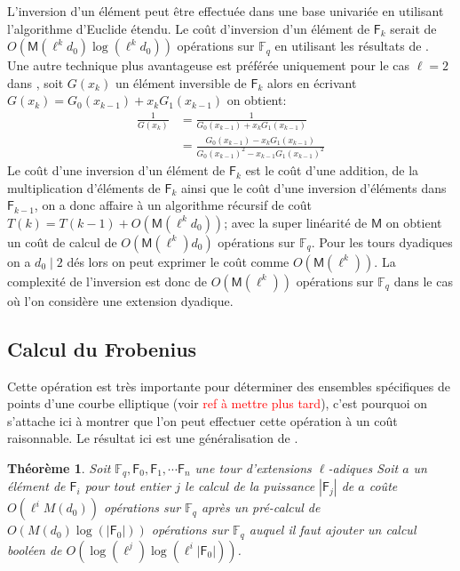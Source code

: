 \documentclass[10pt,a4paper]{book}
\theoremstyle{plain}
\newtheorem{thm}{Théorème}
\theoremstyle{definition}
\theoremstyle{definition}
\theoremstyle{definition}
\theoremstyle{definition}
\theoremstyle{remark}
\theoremstyle{remark}
\begin{document}
L'inversion d'un élément peut être effectuée dans une base univariée en utilisant l'algorithme d'Euclide étendu. Le coût d'inversion d'un élément de $\mathsf{F}_k$ serait de $O(\mathsf{M}(\ell^kd_0)\log(\ell^kd_0))$ opérations sur $\mathbb{F}_q$ en utilisant les résultats de \cite[ch.11]{vzGJG03}. Une autre technique plus avantageuse est préférée uniquement pour le cas $\ell=2$ dans \cite{Doliskani-Schost15}, soit $G(x_k)$ un élément inversible de $\mathsf{F}_k$ alors en écrivant $G(x_k)=G_0(x_{k-1})+x_kG_1(x_{k-1})$ on obtient:
\begin{align*}
\frac{1}{G(x_k)} &=\frac{1}{G_0(x_{k-1})+x_kG_1(x_{k-1})} \\
 				&= \frac{G_0(x_{k-1})-x_kG_1(x_{k-1})}{G_0(x_{k-1})^2-x_{k-1}G_1(x_{k-1})^2}
\end{align*}
Le coût d'une inversion d'un élément de $\mathsf{F}_k$ est le coût d'une addition, de la multiplication d'éléments de $\mathsf{F}_k$ ainsi que le coût d'une inversion d'éléments dans $\mathsf{F}_{k-1}$, on a donc affaire à un algorithme récursif de coût  $T(k)=T(k-1)+O(\mathsf{M}(\ell^kd_0))$; avec la super linéarité de $\mathsf{M}$ on obtient un coût de calcul de $O(\mathsf{M}(\ell^k)d_0)$ opérations sur $\mathbb{F}_q$. Pour les tours dyadiques on a $d_0 \mid 2$ dés lors on peut exprimer le coût comme $O(\mathsf{M}(\ell^k))$. La complexité de l'inversion est donc de $O(\mathsf{M}(\ell^k))$ opérations sur $\mathbb{F}_q$ dans le cas où l'on considère une extension dyadique.

\subsection*{Calcul du Frobenius}

Cette opération est très importante pour déterminer des ensembles spécifiques de points d'une courbe elliptique (voir \textcolor{red}{ref à mettre plus tard}), c'est pourquoi on s'attache ici à montrer que l'on peut effectuer cette opération à un coût raisonnable. Le résultat ici est une généralisation de \cite{Doliskani-Schost15}.

\begin{thm} \label{thm:frob-ell}
Soit $\mathbb{F}_q, \mathsf{F}_0, \mathsf{F}_1,  \cdots \mathsf{F}_n$ une tour d'extensions $\ell$-adiques
Soit $a$ un élément de $\mathsf{F}_i$ pour tout entier $j$ le calcul de la puissance $|\mathsf{F}_j|$ de $a$ coûte
 $O(\ell^{i}M(d_0))$ opérations sur $\mathbb{F}_q$ après un pré-calcul de $O( M(d_0)\log(|\mathsf{F}_0|))$ opérations sur $\mathbb{F}_q$
auquel il faut ajouter un calcul booléen de $O(\log(\ell^j)\log(\ell^i|\mathsf{F}_0|))$.
\end{thm} 
\end{document}
